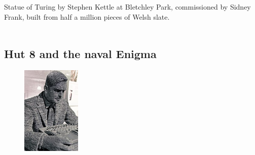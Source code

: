 \documentclass{article}
\begin{document}
\\\\
Statue of Turing by Stephen Kettle at Bletchley Park, commissioned by Sidney Frank, built from half a million pieces of Welsh slate.
\\\\
\subsection{Hut 8 and the naval Enigma}

\begin{figure}
  \centering
  \includegraphics[width=0.25\textwidth]{turing_statue}
\end{figure}
\end{document}
